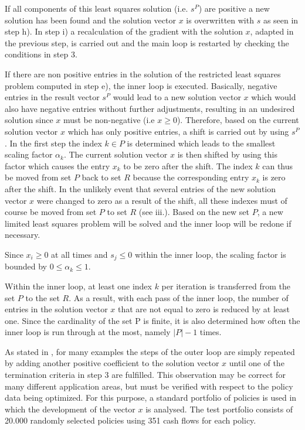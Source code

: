 If all components of this least squares solution (i.e. $s^P$) are positive a new solution has been found and the solution vector $x$ is overwritten with $s$ as seen in step h). In step i) a recalculation of the gradient with the solution $x$, adapted in the previous step, is carried out and the main loop is restarted by checking the conditions in step 3. 

If there are non positive entries in the solution of the restricted least squares problem computed in step e), the inner loop is executed. Basically, negative entries in the result vector $s^P$ would lead to a new solution vector $x$ which would also have negative entries without further adjustments, resulting in an undesired solution since $x$ must be non-negative (i.e $x \geq 0$). Therefore, based on the current solution vector $x$ which has only positive entries, a shift is carried out by using $s^P$. In the first step the index $k \in P$ is determined which leads to the smallest scaling factor $\alpha_k$. The current solution vector $x$ is then shifted by using this factor which causes the entry $x_k$ to be zero after the shift. The index $k$ can thus be moved from set $P$ back to set $R$ because the corresponding entry $x_k$ is zero after the shift. In the unlikely event that several entries of the new solution vector $x$ were changed to zero as a result of the shift, all these indexes must of course be moved from set $P$ to set $R$ (see iii.). Based on the new set $P$, a new limited least squares problem will be solved and the inner loop will be redone if necessary.

\begin{remark}
	Since $x_i \geq 0$ at all times and $s_j \leq 0$ within the inner loop, the scaling factor is bounded by $0 \leq \alpha_k \leq 1$.  
\end{remark}

\begin{remark}
	Within the inner loop, at least one index $k$ per iteration is transferred from the set $P$ to the set $R$.  As a result, with each pass of the inner loop, the number of entries in the solution vector $x$ that are not equal to zero is reduced by at least one. Since the cardinality of the set P is finite, it is also determined how often the inner loop is run through at the most, namely $|P| - 1$ times.
\end{remark}

As stated in \cite[p.~163]{lawson}, for many examples the steps of the outer loop are simply repeated by adding another positive coefficient to the solution vector $x$ until one of the termination criteria in step 3 are fulfilled. This observation may be correct for many different application areas, but must be verified with respect to the policy data being optimized. For this purpose, a standard portfolio of policies is used in which the development of the vector $x$ is analysed. The test portfolio consists of 20.000 randomly selected policies using 351 cash flows for each policy. 

